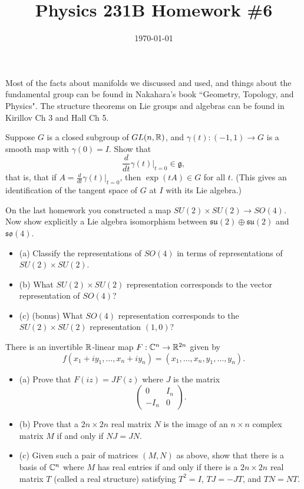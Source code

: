 \documentclass{article}
\date{\today}
\title{Physics 231B Homework \#6}
\begin{document}
\maketitle
Most of the facts about manifolds we discussed and used, and things about the fundamental group can be found in Nakahara's book ``Geometry, Topology, and Physics". The structure theorems on Lie groups and algebras can be found in Kirillov Ch 3 and Hall Ch 5.

\bigskip
\begin{prob}
    Suppose $G$ is a closed subgroup of $GL(n,\mathbb{R})$, and $\gamma(t):(-1,1) \rightarrow G$ is a smooth map with $\gamma(0)=I$. Show that
    \[ \frac{d}{dt}\gamma(t) |_{t=0} \in \mathfrak{g}, \]
    that is, that if $A= \frac{d}{dt}\gamma(t) |_{t=0}$, then $\exp(tA) \in G$ for all $t$. (This gives an identification of the tangent space of $G$ at $I$ with its Lie algebra.)
\end{prob}

\bigskip
\begin{prob}
    On the last homework you constructed a map $SU(2) \times SU(2) \rightarrow SO(4)$. Now show explicitly a Lie algebra isomorphism between $\mathfrak{su}(2) \oplus \mathfrak{su}(2)$ and $\mathfrak{so}(4)$.
\end{prob}

\bigskip
\begin{prob}
    \begin{itemize}
        \item (a) Classify the representations of $SO(4)$ in terms of representations of $SU(2) \times SU(2)$.
        \item (b) What $SU(2) \times SU(2)$ representation corresponds to the vector representation of $SO(4)$?
        \item (c) (bonus) What $SO(4)$ representation corresponds to the $SU(2) \times SU(2)$ representation $(1,0)$?
    \end{itemize}
\end{prob}

\bigskip
\begin{prob}
    There is an invertible $\mathbb{R}$-linear map $F: \mathbb{C}^n \rightarrow \mathbb{R}^{2n}$ given by
    \[ f(x_1+iy_1, \dots, x_n + iy_n) = (x_1, \dots, x_n, y_1, \dots, y_n). \]
    \begin{itemize}
        \item (a) Prove that $F(iz)=JF(z)$ where $J$ is the matrix
            \[ \begin{pmatrix}
                0 & I_n \\
                -I_n & 0
            \end{pmatrix}. \]
        \item (b) Prove that a $2n \times 2n$ real matrix $N$ is the image of an $n \times n$ complex matrix $M$ if and only if $NJ=JN$.
        \item (c) Given such a pair of matrices $(M,N)$ as above, show that there is a basis of $\mathbb{C}^n$ where $M$ has real entries if and only if there is a $2n \times 2n$ real matrix $T$ (called a real structure) satisfying $T^2=I$, $TJ=-JT$, and $TN=NT$.
    \end{itemize}
\end{prob}
\end{document}
